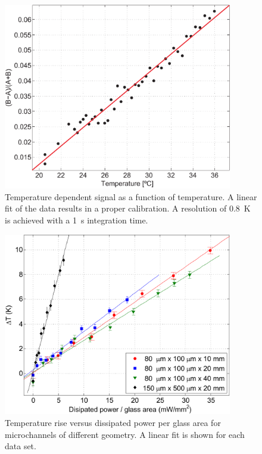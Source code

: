 \documentclass[]{spie}  %
\newcommand{\figsimple}{10cm} %
\begin{document}
\begin{figure}[h!]
\centering
\includegraphics[width=\figsimple]{figs/calibration.pdf}
\caption{Temperature dependent signal as a function of temperature. A linear fit of the data results in a proper calibration. A resolution of 0.8~K is achieved with a 1~s integration time. 
\label{fig:calibration}}
\end{figure}

\begin{figure}[h!]
\centering
\includegraphics[width=\figsimple]{figs/rectas.pdf}
\caption{Temperature rise versus dissipated power per glass area for microchannels of different geometry. A linear fit is shown for each data set.  \label{fig:rectas}}
\end{figure}
\end{document}

